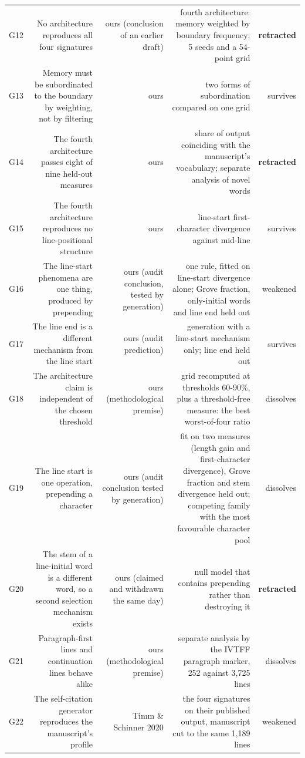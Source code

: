 \documentclass[11pt,a4paper]{article}
\begin{document}
\begin{table}[htbp]
\begin{tabular}{@{}lrrrr@{}}
G12 & No architecture reproduces all four signatures & ours (conclusion of an earlier draft) & fourth architecture: memory weighted by boundary frequency; 5 seeds and a 54-point grid & \textbf{retracted} \\
G13 & Memory must be subordinated to the boundary by weighting, not by filtering & ours & two forms of subordination compared on one grid & survives \\
G14 & The fourth architecture passes eight of nine held-out measures & ours & share of output coinciding with the manuscript's vocabulary; separate analysis of novel words & \textbf{retracted} \\
G15 & The fourth architecture reproduces no line-positional structure & ours & line-start first-character divergence against mid-line & survives \\
G16 & The line-start phenomena are one thing, produced by prepending & ours (audit conclusion, tested by generation) & one rule, fitted on line-start divergence alone; Grove fraction, only-initial words and line end held out & weakened \\
G17 & The line end is a different mechanism from the line start & ours (audit prediction) & generation with a line-start mechanism only; line end held out & survives \\
G18 & The architecture claim is independent of the chosen threshold & ours (methodological premise) & grid recomputed at thresholds 60-90\%, plus a threshold-free measure: the best worst-of-four ratio & dissolves \\
G19 & The line start is one operation, prepending a character & ours (audit conclusion tested by generation) & fit on two measures (length gain and first-character divergence), Grove fraction and stem divergence held out; competing family with the most favourable character pool & dissolves \\
G20 & The stem of a line-initial word is a different word, so a second selection mechanism exists & ours (claimed and withdrawn the same day) & null model that contains prepending rather than destroying it & \textbf{retracted} \\
G21 & Paragraph-first lines and continuation lines behave alike & ours (methodological premise) & separate analysis by the IVTFF paragraph marker, 252 against 3,725 lines & dissolves \\
G22 & The self-citation generator reproduces the manuscript's profile & Timm \& Schinner 2020 & the four signatures on their published output, manuscript cut to the same 1,189 lines & weakened \\
\bottomrule
\end{tabular}
\end{table}
\end{document}
